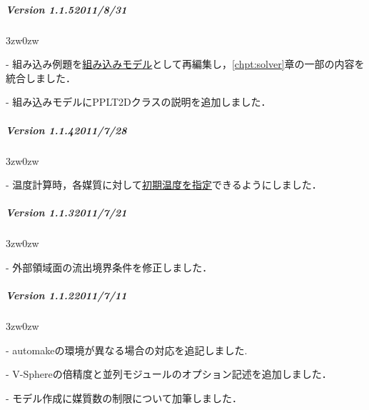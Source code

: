 {\vspace{3mm}

%
\subparagraph{Version 1.1.5\hspace{1cm}2011/8/31}

\begin{description}
\begin{indentation}{3zw}{0zw}
\item[-] 組み込み例題を\hyperlink{tgt:intrinsic model}{組み込みモデル}として再編集し，\ref{chpt:solver}章の一部の内容を統合しました．
\item[-] 組み込みモデルにPPLT2Dクラスの説明を追加しました．
\end{indentation}
\end{description}

\vspace{3mm}

%
\subparagraph{Version 1.1.4\hspace{1cm}2011/7/28}

\begin{description}
\begin{indentation}{3zw}{0zw}
\item[-] 温度計算時，各媒質に対して\hyperlink{tgt:initial_temp}{初期温度を指定}できるようにしました．
\end{indentation}
\end{description}

\vspace{3mm}

%
\subparagraph{Version 1.1.3\hspace{1cm}2011/7/21}

\begin{description}
\begin{indentation}{3zw}{0zw}
\item[-] 外部領域面の流出境界条件を修正しました．
\end{indentation}
\end{description}

\vspace{3mm}

%
\subparagraph{Version 1.1.2\hspace{1cm}2011/7/11}

\begin{description}
\begin{indentation}{3zw}{0zw}
\item[-] automakeの環境が異なる場合の対応を追記しました.
\item[-] V-Sphereの倍精度と並列モジュールのオプション記述を追加しました．
\item[-] モデル作成に媒質数の制限について加筆しました．
\end{indentation}
\end{description}

}
